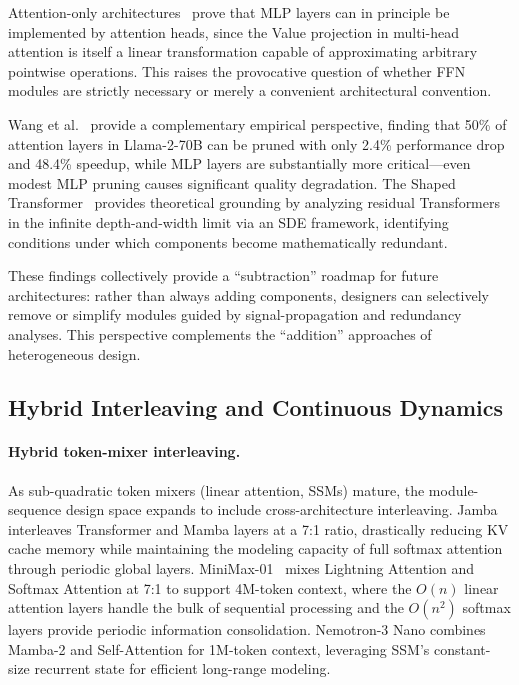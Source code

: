 Attention-only architectures~\cite{attentiononly2023} prove that MLP layers can in principle be implemented by attention heads, since the Value projection in multi-head attention is itself a linear transformation capable of approximating arbitrary pointwise operations. This raises the provocative question of whether FFN modules are strictly necessary or merely a convenient architectural convention.

Wang et al.~\cite{wang2024whatmatters} provide a complementary empirical perspective, finding that 50\% of attention layers in Llama-2-70B can be pruned with only 2.4\% performance drop and 48.4\% speedup, while MLP layers are substantially more critical---even modest MLP pruning causes significant quality degradation. The Shaped Transformer~\cite{noci2023shaped} provides theoretical grounding by analyzing residual Transformers in the infinite depth-and-width limit via an SDE framework, identifying conditions under which components become mathematically redundant.

These findings collectively provide a ``subtraction'' roadmap for future architectures: rather than always adding components, designers can selectively remove or simplify modules guided by signal-propagation and redundancy analyses. This perspective complements the ``addition'' approaches of heterogeneous design.

\subsection{Hybrid Interleaving and Continuous Dynamics}
\label{subsec:hybrid_ode}

\paragraph{Hybrid token-mixer interleaving.}
As sub-quadratic token mixers (linear attention, SSMs) mature, the module-sequence design space expands to include cross-architecture interleaving. Jamba~\cite{lieber2024jamba} interleaves Transformer and Mamba layers at a 7:1 ratio, drastically reducing KV cache memory while maintaining the modeling capacity of full softmax attention through periodic global layers. MiniMax-01~\cite{minimax2025} mixes Lightning Attention and Softmax Attention at 7:1 to support 4M-token context, where the $O(n)$ linear attention layers handle the bulk of sequential processing and the $O(n^2)$ softmax layers provide periodic information consolidation. Nemotron-3 Nano combines Mamba-2 and Self-Attention for 1M-token context, leveraging SSM's constant-size recurrent state for efficient long-range modeling.

